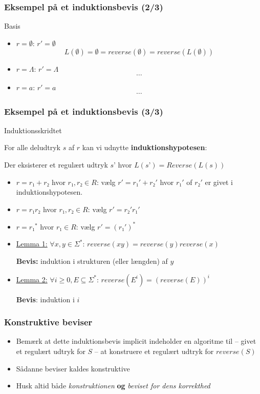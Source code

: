 \documentclass[]{beamer}
\begin{document}
\begin{frame}
\frametitle{Eksempel på et induktionsbevis (2/3)}
Basis
\begin{itemize}
\item $r = ∅$: $r' = ∅$
\[L(∅) = ∅ = reverse(∅) = reverse(L(∅))\]
\item $r = Λ$: $r' = Λ$
\[…\]
\item $r = a$: $r' = a$
\[…\]
\end{itemize}
\end{frame}

\begin{frame}
\frametitle{Eksempel på et induktionsbevis (3/3)}
Induktionsskridtet

For alle deludtryk $s$ af $r$ kan vi udnytte
\textbf{induktionshypotesen}:

Der eksisterer et regulært
udtryk $s’$ hvor $L(s’)=Reverse(L(s))$
\pause
\begin{itemize}[<+->]
\item \underline{$r = r₁+r₂$} hvor $r₁, r₂∈R$: vælg $r' = r₁' + r₂'$ hvor $r₁'$ of
  $r₂'$ er givet i induktionshypotesen.
\item \underline{$r = r₁r₂$} hvor $r₁, r₂∈R$: vælg $r' = r₂'r₁'$
\item \underline{$r = r₁^*$} hvor $r₁∈R$: vælg $r' = (r₁')^*$
\item \underline{Lemma 1:}
$∀x,y∈Σ^*$: $reverse(xy)=
         reverse(y)reverse(x)$

\textbf{Bevis:} induktion i strukturen
(eller længden) af $y$

\item \underline{Lemma 2:}
$∀i≥0,E⊆Σ^*$:
  $reverse(E^i) = (reverse(E))^i$

\textbf{Bevis}: induktion i $i$

\end{itemize}

\end{frame}

\begin{frame}
\frametitle{Konstruktive beviser}
\begin{itemize}
\item Bemærk at dette induktionsbevis implicit indeholder en algoritme
  til – givet et regulært udtryk for $S$ – at konstruere et regulært
  udtryk for $reverse(S)$

\item Sådanne beviser kaldes konstruktive

\item Husk altid både \emph{konstruktionen} \textbf{og} \emph{beviset for dens korrekthed}
\end{itemize}
\end{frame}
\end{document}
